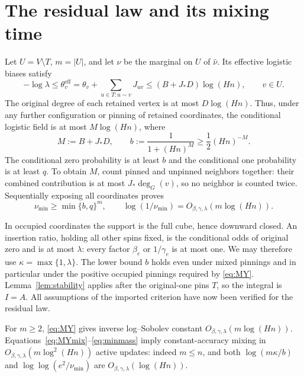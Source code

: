 \documentclass[11pt]{article}
\theoremstyle{remark}\newtheorem{remark}[theorem]{Remark}
\begin{document}
\section{The residual law and its mixing time}

Let $U=V\setminus T$, $m=|U|$, and let $\nu$ be the marginal on $U$ of
$\widehat\nu$. Its effective logistic biases satisfy
\[
 -\log\lambda\leq\theta_v^{\mathrm{eff}}
 =\theta_v+\sum_{u\in T:u\sim v}J_{uv}
 \leq(B+J_*D)\log(Hn),\qquad v\in U.
\]
The original degree of each retained vertex is at most $D\log(Hn)$.
Thus, under any further configuration or pinning of retained coordinates,
the conditional logistic field is at most $M\log(Hn)$, where
\begin{equation}\label{eq:b}
M:=B+J_*D,\qquad b:=\frac1{1+(Hn)^M}\geq\frac12(Hn)^{-M}.
\end{equation}
The conditional zero probability is at least $b$ and the conditional one
probability is at least $q$. To obtain $M$, count pinned and unpinned
neighbors together: their combined contribution is at most
$J_*\deg_G(v)$, so no neighbor is counted twice.
Sequentially exposing all coordinates proves
\begin{equation}\label{eq:minmass}
 \nu_{\min}\geq\min\{b,q\}^{m},\qquad
 \log(1/\nu_{\min})=O_{\beta,\gamma,\lambda}(m\log(Hn)).
\end{equation}

In occupied coordinates the support is the full cube, hence downward
closed. An insertion ratio, holding all other spins fixed, is the
conditional odds of original zero and is at most $\lambda$:
every factor $\beta_e$ or $1/\gamma_e$ is at most one.
We may therefore use $\kappa=\max\{1,\lambda\}$. The lower bound $b$
holds even under mixed pinnings and in particular under the positive
occupied pinnings required by \eqref{eq:MY}. Lemma~\ref{lem:stability}
applies after the original-one pins $T$, so the integral is $I=A$.
All assumptions of the imported criterion have now been verified for
the residual law.

For $m\geq2$, \eqref{eq:MY} gives inverse log--Sobolev constant
$O_{\beta,\gamma,\lambda}(m\log(Hn))$.
Equations~\eqref{eq:MYmix}--\eqref{eq:minmass} imply constant-accuracy
mixing in $O_{\beta,\gamma,\lambda}(m\log^2(Hn))$ active updates:
indeed $m\leq n$, and both
$\log(m\kappa/b)$ and $\log\log(e^2/\nu_{\min})$
are $O_{\beta,\gamma,\lambda}(\log(Hn))$.
\end{document}
